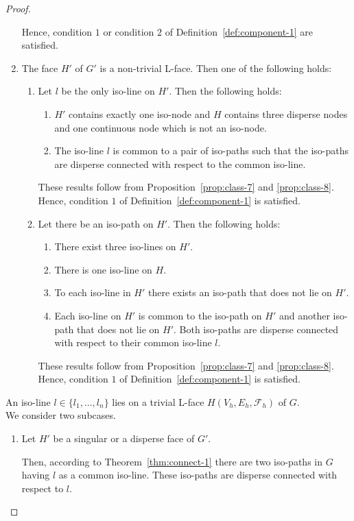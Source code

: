 \documentclass[a4paper,11pt]{article}
\begin{document}
\begin{proof}
\begin{enumerate}
Hence, condition $1$ or condition $2$ of Definition~\ref{def:component-1} are satisfied.
\item The face $H'$ of $G'$ is a non-trivial L-face. Then one of the following holds:
\begin{enumerate}
\item Let $l$ be the only iso-line on $H'$. Then the following holds:
\begin{enumerate}
\item $H'$ contains exactly one iso-node and $H$ contains three disperse nodes and one continuous node
which is not an iso-node.
\item The iso-line $l$ is common to a pair of iso-paths such that the iso-paths are disperse
connected with respect to the common iso-line.
\end{enumerate}
These results follow from Proposition~\ref{prop:class-7} and \ref{prop:class-8}. Hence, condition $1$ of
Definition~\ref{def:component-1} is satisfied.
\item Let there be an iso-path on $H'$. Then the following holds:
\begin{enumerate}
\item There exist three iso-lines on $H'$.
\item There is one iso-line on $H$.
\item To each iso-line in $H'$ there exists an iso-path that does not lie on $H'$.
\item Each iso-line on $H'$ is common to the iso-path on $H'$ and another iso-path that does not lie on
$H'$. Both iso-paths are disperse connected with respect to their common iso-line $l$.
\end{enumerate}
These results follow from Proposition~\ref{prop:class-7} and \ref{prop:class-8}. Hence, condition $1$ of
Definition~\ref{def:component-1} is satisfied.
\end{enumerate}
\end{enumerate}
An iso-line $l\in\{l_1,\ldots,l_n\}$ lies on a trivial L-face
$H(V_h,E_h,\mathcal{F}_h)$ of $G$. \\

We consider two subcases.
\begin{enumerate}
\item Let $H'$ be a singular or a disperse face of $G'$.

Then, according to Theorem~\ref{thm:connect-1} there are two iso-paths in $G$ having $l$ as a common
iso-line. These iso-paths are disperse connected with respect to $l$.


\end{enumerate}
\end{proof}
\end{document}
